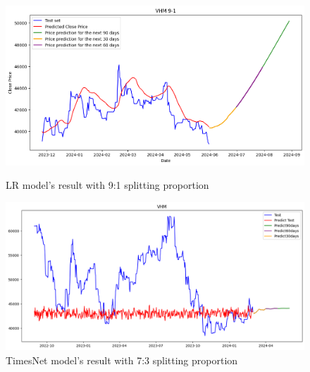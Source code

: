 \documentclass{ieeeojies}
\begin{document}
  \begin{figure}[H]
    \centering
    \begin{minipage}{0.23\textwidth}
    \centering
    \includegraphics[width=1\textwidth]{bibliography/Figure/LR_VHM(9-1).png}
    \caption{LR model's result with 9:1 splitting proportion}
    \label{fig:1}
    \end{minipage}
    \hfill
    \begin{minipage}{0.23\textwidth}
    \centering
    \includegraphics[width=1\textwidth]{bibliography/Figure/VHM_TimesNet(7-3).png}
    \caption{TimesNet model's result with 7:3 splitting proportion}
    \label{fig:2}
    \end{minipage}
  \end{figure}
\end{document}
